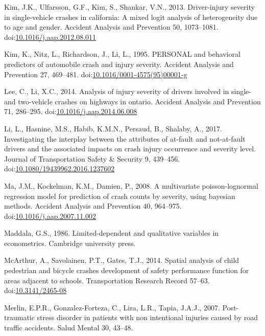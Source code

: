 \documentclass[]{elsarticle} %
\begin{document}
\leavevmode\hypertarget{ref-Kim2013driver}{}%
Kim, J.K., Ulfarsson, G.F., Kim, S., Shankar, V.N., 2013. Driver-injury
severity in single-vehicle crashes in california: A mixed logit analysis
of heterogeneity due to age and gender. Accident Analysis and Prevention
50, 1073--1081.
doi:\href{https://doi.org/10.1016/j.aap.2012.08.011}{10.1016/j.aap.2012.08.011}

\leavevmode\hypertarget{ref-Kim1995personal}{}%
Kim, K., Nitz, L., Richardson, J., Li, L., 1995. PERSONAL and behavioral
predictors of automobile crash and injury severity. Accident Analysis
and Prevention 27, 469--481.
doi:\href{https://doi.org/10.1016/0001-4575(95)00001-g}{10.1016/0001-4575(95)00001-g}

\leavevmode\hypertarget{ref-Lee2014analysis}{}%
Lee, C., Li, X.C., 2014. Analysis of injury severity of drivers involved
in single- and two-vehicle crashes on highways in ontario. Accident
Analysis and Prevention 71, 286--295.
doi:\href{https://doi.org/10.1016/j.aap.2014.06.008}{10.1016/j.aap.2014.06.008}

\leavevmode\hypertarget{ref-Li2017interplay}{}%
Li, L., Hasnine, M.S., Habib, K.M.N., Persaud, B., Shalaby, A., 2017.
Investigating the interplay between the attributes of at-fault and
not-at-fault drivers and the associated impacts on crash injury
occurrence and severity level. Journal of Transportation Safety \&
Security 9, 439--456.
doi:\href{https://doi.org/10.1080/19439962.2016.1237602}{10.1080/19439962.2016.1237602}

\leavevmode\hypertarget{ref-Ma2008multivariate}{}%
Ma, J.M., Kockelman, K.M., Damien, P., 2008. A multivariate
poisson-lognormal regression model for prediction of crash counts by
severity, using bayesian methods. Accident Analysis and Prevention 40,
964--975.
doi:\href{https://doi.org/10.1016/j.aap.2007.11.002}{10.1016/j.aap.2007.11.002}

\leavevmode\hypertarget{ref-Maddala1986limited}{}%
Maddala, G.S., 1986. Limited-dependent and qualitative variables in
econometrics. Cambridge university press.

\leavevmode\hypertarget{ref-McArthur2014spatial}{}%
McArthur, A., Savolainen, P.T., Gates, T.J., 2014. Spatial analysis of
child pedestrian and bicycle crashes development of safety performance
function for areas adjacent to schools. Transportation Research Record
57--63. doi:\href{https://doi.org/10.3141/2465-08}{10.3141/2465-08}

\leavevmode\hypertarget{ref-Merlin2007stress}{}%
Merlin, E.P.R., Gonzalez-Forteza, C., Lira, L.R., Tapia, J.A.J., 2007.
Post-traumatic stress disorder in patients with non intentional injuries
caused by road traffic accidents. Salud Mental 30, 43--48.
\end{document}
